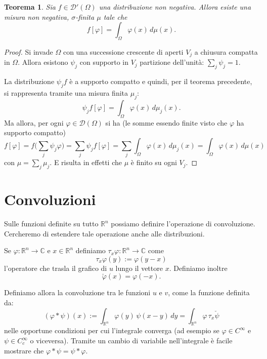 \documentclass[italian,a4paper,oneside,headinclude]{scrbook}
\renewcommand{\phi}{\varphi}
\newcommand{\D}{\mathcal D}
\newcommand{\CC}{\mathbb C}
\newcommand{\RR}{\mathbb R}
\newcommand{\defeq}{:=}
\newtheorem{theorem}{Teorema}
\begin{document}
\begin{theorem}
  Sia $f\in\D'(\Omega)$ una distribuzione non negativa. Allora esiste
  una misura non negativa, $\sigma$-finita $\mu$ tale che
  \[
    f[\phi] = \int_\Omega \phi(x)\, d\mu(x).
  \]
\end{theorem}
%
\begin{proof}
  Si invade $\Omega$ con una successione crescente di aperti $V_j$ a
  chiusura compatta in $\Omega$.
  Allora esistono $\psi_j$ con supporto in $V_j$
  partizione dell'unità: $\sum_j \psi_j = 1$.

  La distribuzione $\psi_j f$ è a supporto compatto e quindi, per il
  teorema precedente, si rappresenta tramite una misura finita
  $\mu_j$:
  \[
  \psi_j f[\phi] = \int_\Omega \phi(x)\, d\mu_j(x).
  \]
  Ma allora, per ogni $\phi\in \D(\Omega)$ si ha (le somme essendo
  finite visto che $\phi$ ha supporto compatto)
  \[
   f[\phi] = f\big(\sum_j \psi_j \phi\big) = \sum_j \psi_j f[\phi] =
   \sum_j \int_\Omega \phi(x)\, d\mu_j(x)
   = \int_\Omega \phi(x) \, d\mu(x)
   \]
   con $\mu = \sum_j \mu_j$. E risulta in effetti che $\mu$ è finito su
   ogni $V_j$.
\end{proof}


\section{Convoluzioni}

Sulle funzioni definite su tutto $\RR^n$ possiamo definire
l'operazione di convoluzione. Cercheremo di estendere tale operazione
anche alle distribuzioni.

Se $\phi\colon\RR^n\to \CC$ e $x\in \RR^n$ definiamo $\tau_x \phi \colon
\RR^n\to \CC$ come
\marginpar{$\tau_x \phi$}
\[
\tau_x \phi(y) \defeq \phi(y-x)
\]
l'operatore che trasla il grafico di $u$ lungo il vettore $x$.
Definiamo inoltre
\marginpar{$\check \phi$}
\[
\check \phi(x) = \phi(-x).
\]

Definiamo allora la convoluzione tra le funzioni $u$ e $v$, come la
funzione definita da:
\marginpar{$\phi * \psi$}
\[
(\phi * \psi)(x)\defeq\int_{\RR^n} \phi(y)\, \psi(x-y) \, dy =
\int_{\RR^n} \phi\, \tau_x \check \psi
\]
nelle opportune condizioni per cui l'integrale converga (ad esempio se
$\phi\in C^\infty$ e $\psi\in C^\infty_c$ o viceversa).
Tramite un cambio di variabile nell'integrale è facile mostrare che
$\phi*\psi=\psi*\phi$.
\end{document}
